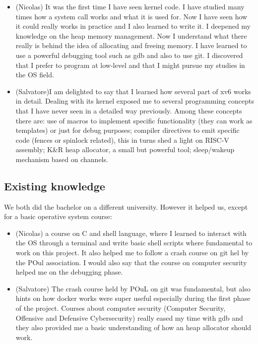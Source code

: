 \documentclass[10pt,a4]{article}
\begin{document}
\begin{itemize}
    \item (Nicolas) It was the first time I have seen kernel code. I have studied many times how a system call works and what it is used for. Now I have seen how it could really works in practice and I also learned to write it. I deepened my knowledge on the heap memory management. Now I understand what there really is behind the idea of allocating and freeing memory. I have learned to use a powerful debugging tool such as gdb and also to use git. I discovered that I prefer to program at low-level and that I might pursue my studies in the OS field.
    
    
    \item (Salvatore)I am delighted to say that I learned how several part of xv6 works in detail. 
    Dealing with its kernel exposed me to several programming concepts that I have never seen in a detailed way previously. 
    Among these concepts there are: use of macros to implement specific functionality (they can work as templates) or just for debug purposes; 
    compiler directives to emit specific code (fences or spinlock related), this in turns shed a light on RISC-V assembly;
    K&R heap allocator, a small but powerful tool; sleep/wakeup mechanism based on channels.

\end{itemize}

 

\subsection{Existing knowledge}

We both did the bachelor on a different university. However it helped us, except for a basic operative system course:
\begin{itemize}
    \item (Nicolas) a course on C and shell language, where I learned to interact with the OS through a terminal and write basic shell scripts where fundamental to work on this project. It also helped me to follow a crash course on git hel by the POul association. I would also say that the course on computer security helped me on the debugging phase.
    \item(Salvatore) The crash course held by POuL on git was fundamental, but also hints on how docker works were super useful especially during the first phase of the project.
    Courses about computer security (Computer Security, Offensive and Defensive Cybersecurity) really eased my time with gdb and they also provided me a basic understanding of how an heap allocator should work.
\end{itemize}
\end{document}
